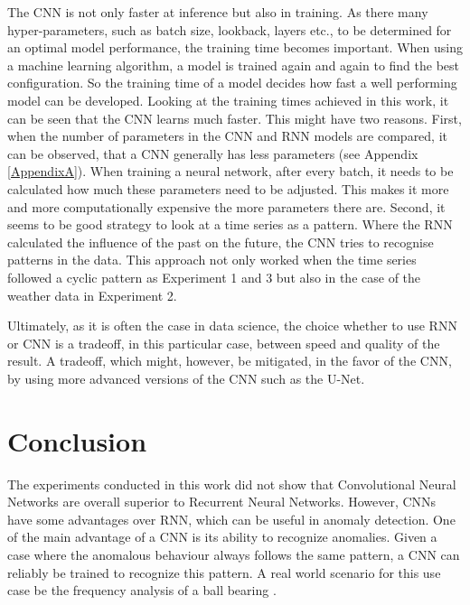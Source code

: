 The CNN is not only faster at inference but also in training. As there many hyper-parameters, such as batch size, lookback, layers etc., to be determined for an optimal model performance, the training time becomes important. When using a machine learning algorithm, a model is trained again and again to find the best configuration. So the training time of a model decides how fast a well performing model can be developed. Looking at the training times achieved in this work, it can be seen that the CNN learns much faster. This might have two reasons. First, when the number of parameters in the CNN and RNN models are compared, it can be observed, that a CNN generally has less parameters (see Appendix \ref{AppendixA}). When training a neural network, after every batch, it needs to be calculated how much these parameters need to be adjusted. This makes it more and more computationally expensive the more parameters there are. Second, it seems to be good strategy to look at a time series as a pattern. Where the RNN calculated the influence of the past on the future, the CNN tries to recognise patterns in the data. This approach not only worked when the time series followed a cyclic pattern as Experiment 1 and 3 but also in the case of the weather data in Experiment 2.     

Ultimately, as it is often the case in data science, the choice whether to use RNN or CNN is a tradeoff, in this particular case, between speed and quality of the result. A tradeoff, which might, however, be mitigated, in the favor of the CNN, by using more advanced versions of the CNN such as the U-Net.





\chapter{Conclusion}
The experiments conducted in this work did not show that Convolutional Neural Networks are overall superior to Recurrent Neural Networks. However, CNNs have some advantages over RNN, which can be useful in anomaly detection. One of the main advantage of a CNN is its ability to recognize anomalies. Given a case where the anomalous behaviour always follows the same pattern, a CNN can reliably be trained to recognize this pattern. A real world scenario for this use case be the frequency analysis of a ball bearing \parencite{Mais2002}.

